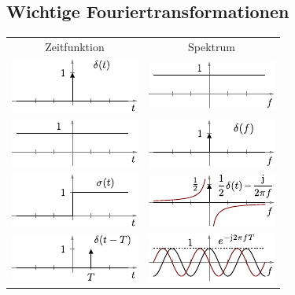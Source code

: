\documentclass[fs, footer]{latex4ei}
\begin{document}
\begin{multicols*}{4}
{	\subsection{Wichtige Fouriertransformationen}

	\begin{tabular*}{\columnwidth}{c@{\extracolsep\fill}c}
		\large Zeitfunktion & \large Spektrum\\ \mrule
		\includegraphics{./img/FT/dirac_t.pdf} & \includegraphics{./img/FT/dirac_f.pdf}\\[1em]
		\includegraphics{./img/FT/1_t.pdf} & \includegraphics{./img/FT/1_f.pdf}\\[1em]
		\includegraphics{./img/FT/sigma_t.pdf} & \includegraphics{./img/FT/sigma_f.pdf}\\[1em]
		\includegraphics{./img/FT/verschiebung_t.pdf} & \includegraphics{./img/FT/verschiebung_f.pdf}\\[1em]

\end{tabular*}}
\end{multicols*}
\end{document}
